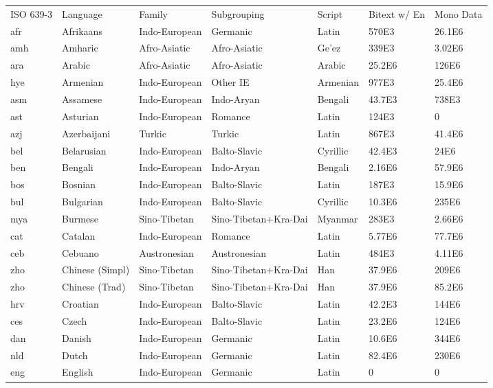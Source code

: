 \begin{tabular}{l l l l lll}
 ISO 639-3 & Language & Family & Subgrouping &  Script & Bitext w/ En  & Mono Data \\
afr	& Afrikaans	&	Indo-European	&	Germanic	&	Latin	&	570E3	&	26.1E6	\\
amh	& Amharic	&	Afro-Asiatic	&	Afro-Asiatic	&	Ge'ez	&	339E3	&	3.02E6	\\
ara	& Arabic	&	Afro-Asiatic	&	Afro-Asiatic	&	Arabic	&	25.2E6	&	126E6	\\
hye	& Armenian	&	Indo-European	&	Other IE	&	Armenian	&	977E3	&	25.4E6	\\
asm	& Assamese	&	Indo-European	&	Indo-Aryan	&	Bengali	&	43.7E3	&	738E3	\\
ast	& Asturian	&	Indo-European	&	Romance	&	Latin	&	124E3	&	0	\\
azj	& Azerbaijani	&	Turkic	&	Turkic	&	Latin	&	867E3	&	41.4E6	\\
bel	& Belarusian	&	Indo-European	&	Balto-Slavic	&	Cyrillic	&	42.4E3	&	24E6	\\
ben	& Bengali	&	Indo-European	&	Indo-Aryan	&	Bengali	&	2.16E6	&	57.9E6	\\
bos	& Bosnian	&	Indo-European	&	Balto-Slavic	&	Latin	&	187E3	&	15.9E6	\\
bul	& Bulgarian	&	Indo-European	&	Balto-Slavic	&	Cyrillic	&	10.3E6	&	235E6	\\
mya	& Burmese	&	Sino-Tibetan	& Sino-Tibetan+Kra-Dai 	&	Myanmar	&	283E3	&	2.66E6	\\
cat	& Catalan	&	Indo-European	&	Romance	&	Latin	&	5.77E6	&	77.7E6	\\
ceb	& Cebuano	&	Austronesian	&	Austronesian	&	Latin	&	484E3	&	4.11E6	\\
zho	& Chinese (Simpl) &	Sino-Tibetan & Sino-Tibetan+Kra-Dai 	&	Han	&	37.9E6	&	209E6\\
zho	& Chinese (Trad) &	Sino-Tibetan & Sino-Tibetan+Kra-Dai 	&	Han	&	37.9E6	&	85.2E6\\
hrv	& Croatian	&	Indo-European	&	Balto-Slavic	&	Latin	&	42.2E3	&	144E6	\\
ces	& Czech	&	Indo-European	&	Balto-Slavic	&	Latin	&	23.2E6	&	124E6	\\
dan	& Danish	&	Indo-European	&	Germanic	&	Latin	&	10.6E6	&	344E6	\\
nld	& Dutch	&	Indo-European	&	Germanic	&	Latin	&	82.4E6	&	230E6	\\
eng	& English	&	Indo-European	&	Germanic	&	Latin	& 0	&	0	\\


\end{tabular}
